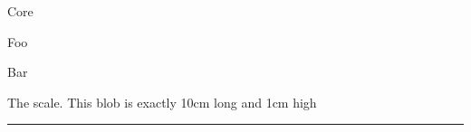 \documentclass[print,Draft]{faosyb}
\begin{document}
\begin{metadata}{Core}
  \lipsum[1]
\end{metadata}

\begin{metadata}{Foo}
  \lipsum[1-12]
\end{metadata}

\begin{metadata}{Bar}
  \lipsum[12-24]
\end{metadata}



\onecolumn



\clearpage


The scale.  This blob is exactly 10cm long and 1cm high

\rule{10cm}{1cm}
\end{document}
